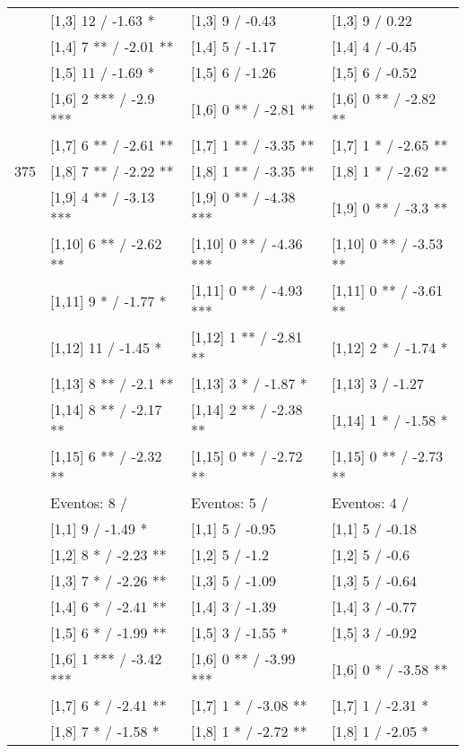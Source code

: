 \begin{table}
\begin{tabular}[t]{llll}
 & {}[1,3] 12  / -1.63 * & {}[1,3] 9  / -0.43 & {}[1,3] 9  / 0.22\\
\addlinespace
 & {}[1,4] 7 ** / -2.01 ** & {}[1,4] 5  / -1.17 & {}[1,4] 4  / -0.45\\
 & {}[1,5] 11  / -1.69 * & {}[1,5] 6  / -1.26 & {}[1,5] 6  / -0.52\\
 & {}[1,6] 2 *** / -2.9 *** & {}[1,6] 0 ** / -2.81 ** & {}[1,6] 0 ** / -2.82 **\\
 & {}[1,7] 6 ** / -2.61 ** & {}[1,7] 1 ** / -3.35 ** & {}[1,7] 1 * / -2.65 **\\
375 & {}[1,8] 7 ** / -2.22 ** & {}[1,8] 1 ** / -3.35 ** & {}[1,8] 1 * / -2.62 **\\
\addlinespace
 & {}[1,9] 4 ** / -3.13 *** & {}[1,9] 0 ** / -4.38 *** & {}[1,9] 0 ** / -3.3 **\\
 & {}[1,10] 6 ** / -2.62 ** & {}[1,10] 0 ** / -4.36 *** & {}[1,10] 0 ** / -3.53 **\\
 & {}[1,11] 9 * / -1.77 * & {}[1,11] 0 ** / -4.93 *** & {}[1,11] 0 ** / -3.61 **\\
 & {}[1,12] 11  / -1.45 * & {}[1,12] 1 ** / -2.81 ** & {}[1,12] 2 * / -1.74 *\\
 & {}[1,13] 8 ** / -2.1 ** & {}[1,13] 3 * / -1.87 * & {}[1,13] 3  / -1.27\\
\addlinespace
 & {}[1,14] 8 ** / -2.17 ** & {}[1,14] 2 ** / -2.38 ** & {}[1,14] 1 * / -1.58 *\\
 & {}[1,15] 6 ** / -2.32 ** & {}[1,15] 0 ** / -2.72 ** & {}[1,15] 0 ** / -2.73 **\\
 & Eventos:  8 / & Eventos:  5 / & Eventos:  4 /\\
 & {}[1,1] 9  / -1.49 * & {}[1,1] 5  / -0.95 & {}[1,1] 5  / -0.18\\
 & {}[1,2] 8 * / -2.23 ** & {}[1,2] 5  / -1.2 & {}[1,2] 5  / -0.6\\
\addlinespace
 & {}[1,3] 7 * / -2.26 ** & {}[1,3] 5  / -1.09 & {}[1,3] 5  / -0.64\\
 & {}[1,4] 6 * / -2.41 ** & {}[1,4] 3  / -1.39 & {}[1,4] 3  / -0.77\\
 & {}[1,5] 6 * / -1.99 ** & {}[1,5] 3  / -1.55 * & {}[1,5] 3  / -0.92\\
 & {}[1,6] 1 *** / -3.42 *** & {}[1,6] 0 ** / -3.99 *** & {}[1,6] 0 * / -3.58 **\\
 & {}[1,7] 6 * / -2.41 ** & {}[1,7] 1 * / -3.08 ** & {}[1,7] 1  / -2.31 *\\
\addlinespace
500 & {}[1,8] 7 * / -1.58 * & {}[1,8] 1 * / -2.72 ** & {}[1,8] 1  / -2.05 *\\

\end{tabular}
\end{table}
